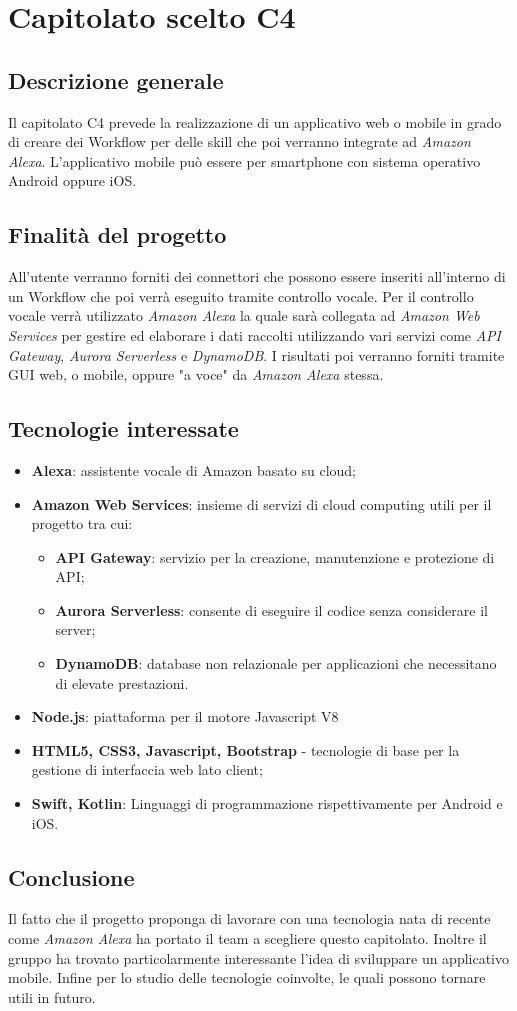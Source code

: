 \chapter{Capitolato scelto C4}
\section{Descrizione generale}
Il capitolato C4 prevede la realizzazione di un applicativo web o mobile in grado di creare dei Workflow per delle skill che poi verranno integrate ad \emph{Amazon Alexa}.
L'applicativo mobile può essere per smartphone con sistema operativo Android oppure iOS.
\section{Finalit\`a del progetto}
All'utente verranno forniti dei connettori che possono essere inseriti all'interno di un Workflow che poi verrà eseguito tramite controllo vocale.  
Per il controllo vocale verrà utilizzato \emph{Amazon Alexa} la quale sarà collegata ad \emph{Amazon Web Services} per gestire ed elaborare i dati raccolti utilizzando vari servizi come \emph{API Gateway}, \emph{Aurora Serverless} e \emph{DynamoDB}.
I risultati poi verranno forniti tramite GUI web, o mobile, oppure "a voce" da \emph{Amazon Alexa} stessa.
\section{Tecnologie interessate}
\begin{itemize}
	\item \textbf{Alexa}: assistente vocale di Amazon basato su cloud;
	\item \textbf{Amazon Web Services}: insieme di servizi di cloud computing utili per il progetto tra cui:
	\begin{itemize}
	\item \textbf{API Gateway}: servizio per la creazione, manutenzione e protezione di API;
	\item \textbf{Aurora Serverless}: consente di eseguire il codice senza considerare il server;
	\item \textbf{DynamoDB}: database non relazionale per applicazioni che necessitano di elevate prestazioni.
	\end{itemize}
	\item \textbf{Node.js}: piattaforma per il motore Javascript V8
	\item \textbf{HTML5, CSS3, Javascript, Bootstrap} - tecnologie di base per la gestione di interfaccia web lato client;
	\item \textbf{Swift, Kotlin}: Linguaggi di programmazione rispettivamente per Android e iOS.
\end{itemize}
\section{Conclusione}
Il fatto che il progetto proponga di lavorare con una tecnologia nata di recente come \emph{Amazon Alexa} ha portato il team a scegliere questo capitolato. Inoltre il gruppo ha trovato particolarmente interessante l'idea di sviluppare un applicativo mobile. Infine per lo studio delle tecnologie coinvolte, le quali possono tornare utili in futuro.